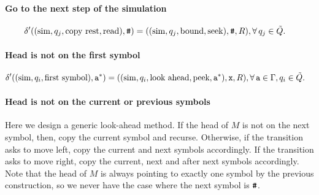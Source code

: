 \paragraph{Go to the next step of the simulation}
\begin{align}
  \delta'((\text{sim}, q_j, \text{copy rest}, \text{read}), \texttt{\#})
  &= ((\text{sim}, q_j, \text{bound}, \text{seek}), \texttt{\#}, R),
  \forall\,
  q_j \in \tilde{Q}.
\end{align}

\paragraph{Head is not on the first symbol}
\begin{align}
  \delta'((\text{sim}, q_i, \text{first symbol}),\texttt{a}^*)
  &=((\text{sim}, q_i, \text{look ahead}, \text{peek}, \texttt{a}^*), \texttt{x}, R),
  \forall\,
  \texttt{a} \in \Gamma,
  q_i \in \tilde{Q}.
\end{align}


\paragraph{Head is not on the current or previous symbols}
Here we design a generic look-ahead method. If the head of $M$ is not on the next
symbol, then, copy the current symbol and recurse. Otherwise, if the transition
asks to move left, copy the current and next symbols accordingly. If the
transition asks to move right, copy the current, next and after next symbols
accordingly. Note that the head of $M$ is always pointing to exactly one symbol
by the previous construction, so we never have the case where the next symbol
is $\texttt{\#}$.

